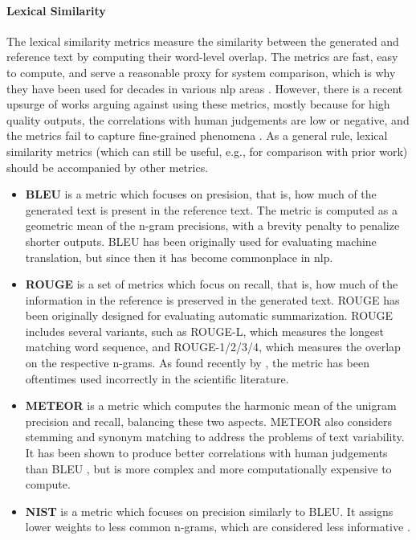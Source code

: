 \paragraph{Lexical Similarity} The lexical similarity metrics measure the similarity between the generated and reference text by computing their word-level overlap. The metrics are fast, easy to compute, and serve a reasonable proxy for system comparison, which is why they have been used for decades in various \ac{nlp} areas \cite{celikyilmazEvaluationTextGeneration2021}. However, there is a recent upsurge of works arguing against using these metrics, mostly because for high quality outputs, the correlations with human judgements are low or negative, and the metrics fail to capture fine-grained phenomena \cite{mathurTangledBLEUReevaluating2020,kocmiShipNotShip2021,gehrmannRepairingCrackedFoundation2022}. As a general rule, lexical similarity metrics (which can still be useful, e.g., for comparison with prior work) should be accompanied by other metrics.

\begin{itemize}
    \item \textbf{BLEU} \cite{papineni2002bleu} is a metric which focuses on presision, that is, how much of the generated text is present in the reference text. The metric is computed as a geometric mean of the n-gram precisions, with a brevity penalty to penalize shorter outputs. BLEU has been originally used for evaluating machine translation, but since then it has become commonplace in \ac{nlp}.
    \item \textbf{ROUGE} \cite{lin-2004-rouge} is a set of metrics which focus on recall, that is, how much of the information in the reference is preserved in the generated text. ROUGE has been originally designed for evaluating automatic summarization. ROUGE includes several variants, such as ROUGE-L, which measures the longest matching word sequence, and ROUGE-{1/2/3/4}, which measures the overlap on the respective n-grams. As found recently by \citet{gruskyRogueScores2023}, the metric has been oftentimes used incorrectly in the scientific literature.
    \item \textbf{METEOR} \cite{banerjee-lavie-2005-meteor} is a metric which computes the harmonic mean of the unigram precision and recall, balancing these two aspects. METEOR also considers stemming and synonym matching to address the problems of text variability. It has been shown to produce better correlations with human judgements than BLEU \cite{agarwal2008meteor}, but is more complex and more computationally expensive to compute.
    \item \textbf{NIST} \cite{martin2000nist} is a metric which focuses on precision similarly to BLEU. It assigns lower weights to less common n-grams, which are considered less informative \cite{doddington2002automatic}.
\end{itemize}
